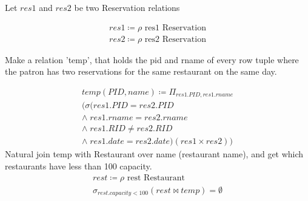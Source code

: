 \documentclass{article}
\begin{document}
\begin{enumerate}
        Let $res1$ and $res2$ be two Reservation relations
        
        \begin{align}
        res1\coloneqq \rho \text{  res1 Reservation}  \\
        res2\coloneqq \rho \text{  res2 Reservation}
		\end{align}     
		
		Make a relation 'temp', that holds the pid and rname of every row tuple where the patron has two reservations for the same restaurant on the same day. 
		 
		\begin{align}
       	temp(PID, name)\coloneqq \Pi_{res1.PID,res1.rname}\\(\sigma(res1.PID=res2.PID \\ \wedge \; res1.rname = res2.rname\\ \wedge\; res1.RID \neq res2.RID \\ \wedge \; res1.date = res2.date)(res1 \times res2))
		\end{align} 
		Natural join temp with Restaurant over name (restaurant name), and get which restaurants have less than 100 capacity.
		 \begin{align}
		 rest \coloneqq \rho \text{  rest Restaurant}\\ 
		 \sigma_{rest.capacity < 100} (rest \bowtie temp) = \emptyset
		 \end{align}
		
\end{enumerate}
\end{document}
